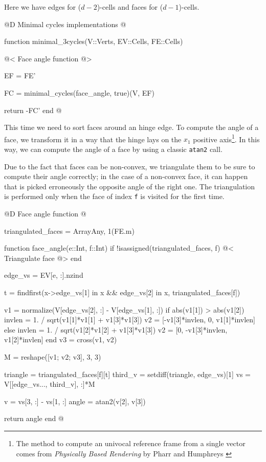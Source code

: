 Here we have edges for ($d-2$)-cells and faces for ($d-1$)-cells.

@D Minimal cycles implementations
@{function minimal_3cycles(V::Verts, EV::Cells, FE::Cells)

    @< Face angle function @>

    EF = FE'

    FC = minimal_cycles(face_angle, true)(V, EF)

    return -FC'
end
@}

This time we need to sort faces around an hinge edge.
To compute the angle of a face, we transform it
in a way that the hinge lays on the $x_1$ positive
axis\footnote{The method to compute an univocal reference frame 
from a single vector comes from \textit{Physically Based Rendering} by
Pharr and Humphreys \cite{Pharr:2010:PBR:1854996}}. In this way, 
we can compute the angle of a face
by using a classic \texttt{atan2} call. 

Due to the fact that faces can be non-convex, 
we triangulate them to be sure to compute their 
angle correctly; in the case of a non-convex face, 
it can happen that is picked erroneously the opposite
angle of the right one. The triangulation is performed
only when the face of index \texttt{f} is visited for the first time.


@D Face angle function
@{triangulated_faces = Array{Any, 1}(FE.m)

function face_angle(e::Int, f::Int)
    if !isassigned(triangulated_faces, f)
        @< Triangulate face @>
    end

    edge_vs = EV[e, :].nzind

    t = findfirst(x->edge_vs[1] in x && edge_vs[2] in x, triangulated_faces[f])
    
    v1 = normalize(V[edge_vs[2], :] - V[edge_vs[1], :])
    if abs(v1[1]) > abs(v1[2])
        invlen = 1. / sqrt(v1[1]*v1[1] + v1[3]*v1[3])
        v2 = [-v1[3]*invlen, 0, v1[1]*invlen]
    else
        invlen = 1. / sqrt(v1[2]*v1[2] + v1[3]*v1[3])
        v2 = [0, -v1[3]*invlen, v1[2]*invlen]
    end
    v3 = cross(v1, v2)

    M = reshape([v1; v2; v3], 3, 3)

    triangle = triangulated_faces[f][t]
    third_v = setdiff(triangle, edge_vs)[1]
    vs = V[[edge_vs..., third_v], :]*M

    v = vs[3, :] - vs[1, :]
    angle = atan2(v[2], v[3]) 

    return angle
end
@}


